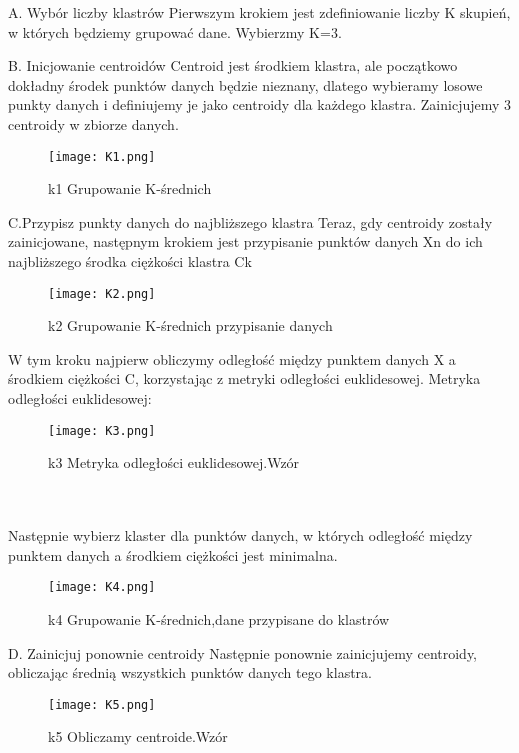     A. Wybór liczby klastrów
Pierwszym krokiem jest zdefiniowanie liczby K skupień, w których będziemy grupować dane. Wybierzmy K=3.

    B. Inicjowanie centroidów
Centroid jest środkiem klastra, ale początkowo dokładny środek punktów danych będzie nieznany, dlatego wybieramy losowe punkty danych i definiujemy je jako centroidy dla każdego klastra. Zainicjujemy 3 centroidy w zbiorze danych.

\begin{figure}[h!]
    \label{fig:k1}
    \centering \texttt{[image: K1.png]}
    \caption{k1 Grupowanie K-średnich\cite{clust2020}}
\end{figure}
 \newpage
 C.Przypisz punkty danych do najbliższego klastra
Teraz, gdy centroidy zostały zainicjowane, następnym krokiem jest przypisanie punktów danych Xn do ich najbliższego środka ciężkości klastra Ck
\begin{figure}[!h]
    \label{fig:k2}
    \centering \texttt{[image: K2.png]}
    \caption{k2 Grupowanie K-średnich przypisanie danych\cite{clust2020}}
\end{figure}

W tym kroku najpierw obliczymy odległość między punktem danych X a środkiem ciężkości C, korzystając z metryki odległości euklidesowej.
Metryka odległości euklidesowej:
\begin{figure}[h!]
    \label{fig:k3}
    \centering \texttt{[image: K3.png]}
    \caption{k3 Metryka odległości euklidesowej.Wzór\cite{clust2020}}
\end{figure}
\\
\\

Następnie wybierz klaster dla punktów danych, w których odległość między punktem danych a środkiem ciężkości jest minimalna.
\begin{figure}[h!]
    \label{fig:k4}
    \centering \texttt{[image: K4.png]}
    \caption{k4 Grupowanie K-średnich,dane przypisane do klastrów\cite{clust2020}}
\end{figure}
  
    D.  Zainicjuj ponownie centroidy
Następnie ponownie zainicjujemy centroidy, obliczając średnią wszystkich punktów danych tego klastra.
\begin{figure}[!h]
    \label{fig:k5}
    \centering \texttt{[image: K5.png]}
    \caption{k5 Obliczamy centroide.Wzór\cite{clust2020}}
\end{figure}

